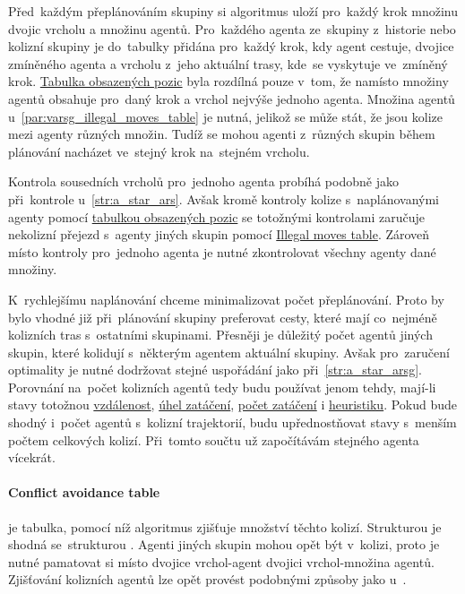 Před~každým přeplánováním skupiny si algoritmus uloží pro~každý krok množinu dvojic vrcholu a množinu agentů.
Pro~každého agenta ze~skupiny z~historie nebo kolizní skupiny je do~tabulky přidána pro~každý krok, kdy agent cestuje,
dvojice zmíněného agenta a vrcholu z~jeho aktuální trasy, kde~se vyskytuje ve~zmíněný krok.
\hyperref[par:obsazene_pozice]{Tabulka obsazených pozic} byla rozdílná pouze v~tom,
že namísto množiny agentů obsahuje pro~daný krok a vrchol nejvýše jednoho agenta.
Množina agentů u~\ref{par:varsg_illegal_moves_table} je nutná, jelikož se může stát, že jsou kolize mezi
agenty různých množin.
Tudíž se mohou agenti z~různých skupin během plánování nacházet ve~stejný krok na~stejném vrcholu.

Kontrola sousedních vrcholů pro~jednoho agenta probíhá podobně jako při~kontrole u~\ref{str:a_star_ars}.
Avšak kromě kontroly kolize s~naplánovanými agenty pomocí \hyperref[par:obsazene_pozice]{tabulkou obsazených pozic}
se totožnými kontrolami zaručuje nekolizní přejezd s~agenty jiných skupin pomocí
\hyperref[par:varsg_illegal_moves_table]{Illegal moves table}.
Zároveň místo kontroly pro~jednoho agenta je nutné zkontrolovat všechny agenty dané množiny.

K~rychlejšímu naplánování chceme minimalizovat počet přeplánování.
Proto by bylo vhodné již při~plánování skupiny preferovat cesty,
které mají co~nejméně kolizních tras s~ostatními skupinami.
Přesněji je důležitý počet agentů jiných skupin, které kolidují s~některým agentem aktuální skupiny.
Avšak pro~zaručení optimality je nutné dodržovat stejné uspořádání jako při~\ref{str:a_star_arsg}.
Porovnání na~počet kolizních agentů tedy budu používat jenom tehdy, mají-li stavy totožnou
\hyperref[par:ars_vzdalenost]{vzdálenost}, \hyperref[par:ars_uhel_zataceni]{úhel zatáčení},
\hyperref[par:ars_pocet_zataceni]{počet zatáčení} i \hyperref[par:ars_heuristika]{heuristiku}.
Pokud bude shodný i~počet agentů s~kolizní trajektorií, budu upřednostňovat stavy s~menším počtem celkových kolizí.
Při~tomto součtu už započítávám stejného agenta vícekrát.

\paragraph{Conflict avoidance table}\label{par:varsg_conflict_avoidance_table} je tabulka, pomocí níž
algoritmus zjišťuje množství těchto kolizí.
Strukturou je shodná se~strukturou .
Agenti jiných skupin mohou opět být v~kolizi,
proto je nutné pamatovat si místo dvojice vrchol-agent dvojici vrchol-množina agentů.
Zjišťování kolizních agentů lze opět provést podobnými způsoby jako u~.

